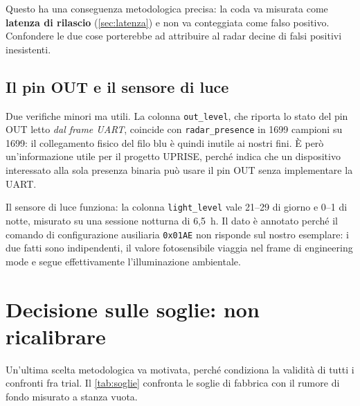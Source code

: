Questo ha una conseguenza metodologica precisa: la coda va misurata come
\textbf{latenza di rilascio} (\cref{sec:latenza}) e non va conteggiata come falso
positivo. Confondere le due cose porterebbe ad attribuire al radar decine di falsi
positivi inesistenti.

\subsection{Il pin OUT e il sensore di luce}

Due verifiche minori ma utili. La colonna \texttt{out\_level}, che riporta lo stato
del pin OUT letto \emph{dal frame UART}, coincide con \texttt{radar\_presence} in
1699 campioni su 1699: il collegamento fisico del filo blu è quindi inutile ai
nostri fini. È però un'informazione utile per il progetto UPRISE, perché indica che
un dispositivo interessato alla sola presenza binaria può usare il pin OUT senza
implementare la UART.

Il sensore di luce funziona: la colonna \texttt{light\_level} vale 21--29 di giorno
e 0--1 di notte, misurato su una sessione notturna di 6,5~h. Il dato è annotato
perché il comando di configurazione ausiliaria \texttt{0x01AE} non risponde sul
nostro esemplare: i due fatti sono indipendenti, il valore fotosensibile viaggia
nel frame di engineering mode e segue effettivamente l'illuminazione ambientale.

\section{Decisione sulle soglie: non ricalibrare}
\label{sec:soglie}

Un'ultima scelta metodologica va motivata, perché condiziona la validità di tutti i
confronti fra trial. Il \cref{tab:soglie} confronta le soglie di fabbrica con il
rumore di fondo misurato a stanza vuota.

